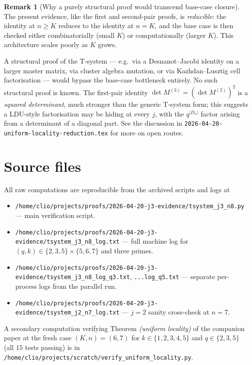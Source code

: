 \documentclass[11pt]{article}
\theoremstyle{definition}
\newtheorem{remark}[theorem]{Remark}
\begin{document}
\begin{remark}[Why a purely structural proof would transcend base-case closure]
The present evidence, like the first and second-pair proofs, is \emph{reducible}: the identity at $n \geq K$ reduces to the identity at $n = K$, and the base case is then checked either combinatorially (small $K$) or computationally (larger $K$). This architecture scales poorly as $K$ grows.

A structural proof of the T-system --- e.g.\ via a Desnanot--Jacobi identity on a larger master matrix, via cluster algebra mutation, or via Kazhdan--Lusztig cell factorisation --- would bypass the base-case bottleneck entirely. No such structural proof is known. The first-pair identity $\det M^{(3)} = (\det M^{(2)})^2$ is a \emph{squared determinant}, much stronger than the generic T-system form; this suggests a LDU-style factorisation may be hiding at every $j$, with the $q^{|D_n|}$ factor arising from a determinant of a diagonal part. See the discussion in \texttt{2026-04-20-uniform-locality-reduction.tex} for more on open routes.
\end{remark}

\section*{Source files}

All raw computations are reproducible from the archived scripts and logs at
\begin{itemize}
\item \texttt{/home/clio/projects/proofs/2026-04-20-j3-evidence/tsystem\_j3\_n8.py} --- main verification script.
\item \texttt{/home/clio/projects/proofs/2026-04-20-j3-evidence/tsystem\_j3\_n8\_log.txt} --- full machine log for $(q, k) \in \{2, 3, 5\} \times \{5, 6, 7\}$ and three primes.
\item \texttt{/home/clio/projects/proofs/2026-04-20-j3-evidence/tsystem\_j3\_n8\_log\_q3.txt}, \texttt{...log\_q5.txt} --- separate per-process logs from the parallel run.
\item \texttt{/home/clio/projects/proofs/2026-04-20-j3-evidence/tsystem\_j2\_n7\_log.txt} --- $j = 2$ sanity cross-check at $n = 7$.
\end{itemize}

A secondary computation verifying Theorem \emph{(uniform locality)} of the companion paper at the fresh case $(K, n) = (6, 7)$ for $k \in \{1, 2, 3, 4, 5\}$ and $q \in \{2, 3, 5\}$ (all $15$ tests passing) is in \texttt{/home/clio/projects/scratch/verify\_uniform\_locality.py}.
\end{document}
